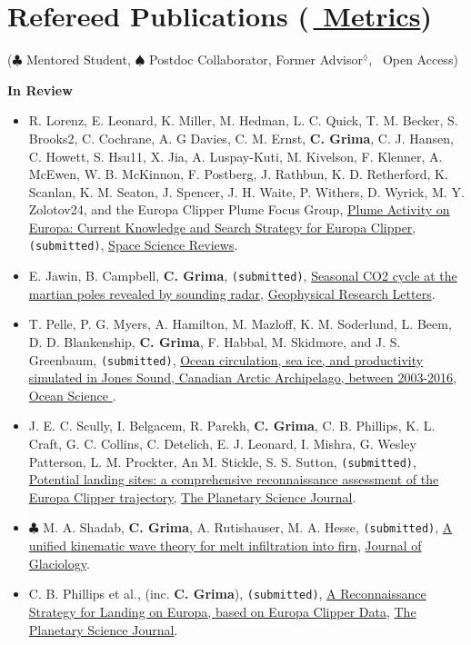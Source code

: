 \section*{Refereed Publications (\href{https://scholar.google.com/citations?user=kaUVku0AAAAJ&hl=fr}{\aiGoogleScholar $\,$ Metrics})}

($\clubsuit$ Mentored Student, $\spadesuit$ Postdoc Collaborator, Former Advisor$^\lozenge$, \aiOpenAccessSquare $\,$ Open Access)
\vspace{1em}

\textbf{In Review}
\begin{itemize}

\item
  R. Lorenz, E. Leonard, K. Miller, M. Hedman, L. C. Quick, T. M. Becker, S. Brooks2, C. Cochrane, A. G Davies, C. M. Ernst, \textbf{C. Grima}, C. J. Hansen, C. Howett, S. Hsu11, X. Jia, A. Luspay-Kuti, M. Kivelson, F. Klenner, A. McEwen, W. B. McKinnon, F. Postberg, J. Rathbun, K. D. Retherford, K. Scanlan, K. M. Seaton, J. Spencer, J. H. Waite, P. Withers, D. Wyrick, M. Y. Zolotov24, and the Europa Clipper Plume Focus Group, \href{}{Plume Activity on Europa: Current Knowledge and Search Strategy for Europa Clipper}, \texttt{(submitted)}, \ul{Space Science Reviews}.

\item
  E. Jawin, B. Campbell, \textbf{C. Grima}, \texttt{(submitted)}, \href{}{Seasonal CO2 cycle at the martian poles revealed by sounding radar}, \ul{Geophysical Research Letters}.

\item
  T. Pelle, P. G. Myers, A. Hamilton, M. Mazloff, K. M. Soderlund, L. Beem, D. D. Blankenship, \textbf{C. Grima}, F. Habbal, M. Skidmore, and J. S. Greenbaum, \texttt{(submitted)}, \href{}{Ocean circulation, sea ice, and productivity simulated in Jones Sound, Canadian Arctic Archipelago, between 2003-2016}, \ul{Ocean Science }.

\item
  J. E. C. Scully, I. Belgacem, R. Parekh, \textbf{C. Grima}, C. B. Phillips, K. L. Craft, G. C. Collins, C. Detelich, E. J. Leonard, I. Mishra, G. Wesley Patterson, L. M. Prockter, An M. Stickle, S. S. Sutton, \texttt{(submitted)}, \href{}{Potential landing sites: a comprehensive reconnaissance assessment of the Europa Clipper trajectory}, \ul{The Planetary Science Journal}.

\item
  $\clubsuit$ M. A. Shadab, \textbf{C. Grima}, A. Rutishauser, M. A. Hesse, \texttt{(submitted)}, \href{}{A unified kinematic wave theory for melt infiltration into firn}, \ul{Journal of Glaciology}. 

\item
  C. B. Phillips et al., (inc. \textbf{C. Grima}), \texttt{(submitted)}, \href{}{A Reconnaissance Strategy for Landing on Europa, based on Europa Clipper Data}, \ul{The Planetary Science Journal}. 

\end{itemize}


